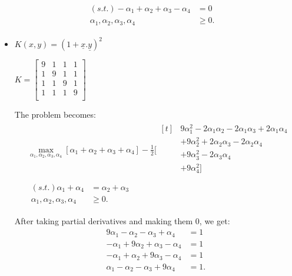 \documentclass[letter, 12pt]{article}
\begin{document}
\begin{enumerate}
\begin{align*}
    	&
    	\begin{aligned}
    	(s.t.) -\alpha_1 + \alpha_2 + \alpha_3 -\alpha_4 &= 0 \\
    	\alpha_1, \alpha_2, \alpha_3, \alpha_4 &\ge 0.
    	\end{aligned}
    	\end{align*}
    	\begin{itemize}
    		\item{$ K(x, y) = (1 + \underline{x}.\underline{y})^ 2 $}
    		\par{}
    		$ K = \begin{bmatrix}
    		9 & 1 & 1 & 1 \\
    		1 & 9 & 1 & 1 \\
    		1 & 1 & 9 & 1 \\
    		1 & 1 & 1 & 9 \\
    		\end{bmatrix} $
    		\par{The problem becomes:}
    		\begin{align*}
    		&\max_{\alpha_1, \alpha_2, \alpha_3, \alpha_4} [\alpha_1 + \alpha_2 + \alpha_3 + \alpha_4] - \frac{1}{2} [
    		\begin{aligned}[t]
    		&9 \alpha_1^2 - 2\alpha_1 \alpha_2 - 2\alpha_1 \alpha_3 + 2\alpha_1 \alpha_4 \\
    		& + 9 \alpha_2^2 + 2\alpha_2 \alpha_3 - 2\alpha_2 \alpha_4 \\
    		& + 9 \alpha_3^2 - 2\alpha_3 \alpha_4 \\
    		& + 9 \alpha_4^2 ] \\
    		\end{aligned} \\
    		&
    		\begin{aligned}
    		(s.t.) \alpha_1 + \alpha_4 &= \alpha_2 + \alpha_3 \\
    		\alpha_1, \alpha_2, \alpha_3, \alpha_4 &\ge 0.
    		\end{aligned}
    		\end{align*}
    		\par{After taking partial derivatives and making them 0, we get:}
    		\begin{align*}
    			9 \alpha_1 - \alpha_2 - \alpha_3 + \alpha_4 &= 1 \\
    			-\alpha_1 + 9 \alpha_2 + \alpha_3 - \alpha_4 &= 1 \\
    			- \alpha_1 + \alpha_2 + 9 \alpha_3 - \alpha_4 &= 1 \\
    			\alpha_1 - \alpha_2 - \alpha_3 + 9 \alpha_4 &= 1 .

\end{align*}
\end{itemize}
\end{enumerate}
\end{document}
